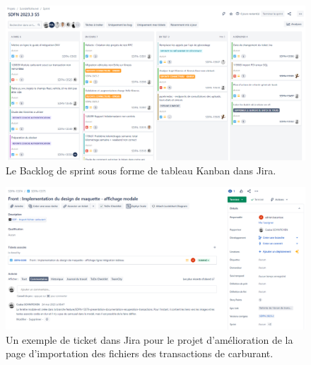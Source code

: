 \begin{appendices}
    \begin{figure}[ht]
        \centering
        \includegraphics[width=\textwidth]{img/sprint}
        \caption{Le Backlog de sprint sous forme de tableau Kanban dans Jira.}
        \label{fig:sprint-backlog}
    \end{figure}

    \begin{figure}[ht]
        \centering
        \includegraphics[width=\textwidth]{img/ticket}
        \caption{Un exemple de ticket dans Jira pour le projet d'amélioration de la page d'importation des fichiers des transactions de carburant.}
        \label{fig:ticket}
    \end{figure}


\end{appendices}